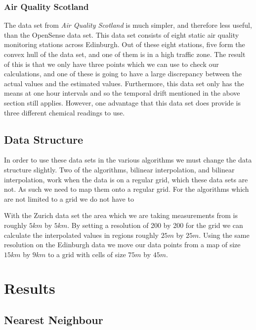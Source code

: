			\subsubsection{Air Quality Scotland}\label{prediction_evaluation_methodology_data_sets_air_quality_scotland}

				The data set from \emph{Air Quality Scotland} is much simpler, and therefore less useful, than the OpenSense data set. This data set consists of eight static air quality monitoring stations across Edinburgh. Out of these eight stations, five form the convex hull of the data set, and one of them is in a high traffic zone. The result of this is that we only have three points which we can use to check our calculations, and one of these is going to have a large discrepancy between the actual values and the estimated values. Furthermore, this data set only has the means at one hour intervals and so the temporal drift mentioned in the above section still applies. However, one advantage that this data set does provide is three different chemical readings to use. 

		\subsection{Data Structure}\label{prediction_evaluation_methodology_data_structure}
			
			In order to use these data sets in the various algorithms we must change the data structure slightly. Two of the algorithms, bilinear interpolation, and bilinear interpolation, work when the data is on a regular grid, which these data sets are not. As such we need to map them onto a regular grid. For the algorithms which are not limited to a grid we do not have to

			With the Zurich data set the area which we are taking measurements from is roughly $5km$ by $5km$. By setting a resolution of 200 by 200 for the grid we can calculate the interpolated values in regions roughly $25m$ by $25m$. Using the same resolution on the Edinburgh data we move our data points from a map of size $15km$ by $9km$ to a grid with cells of size $75m$ by $45m$. 


		

    \section{Results}\label{prediction_evaluation_results}

        \subsection{Nearest Neighbour}\label{prediction_evaluation_results_nearest_neighbour}

